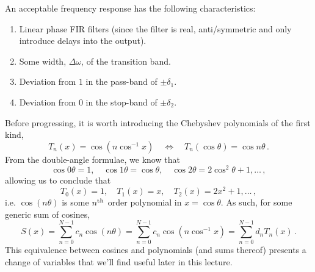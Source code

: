 %
An acceptable frequency response has the following characteristics:
%
\begin{enumerate}
\item Linear phase FIR filters (since the filter is real, anti/symmetric
  and only introduce delays into the output).
\item Some width, $\Delta\omega$, of the transition band.
\item Deviation from $1$ in the pass-band of $\pm\delta_1$.
\item Deviation from $0$ in the stop-band of $\pm\delta_2$.
\end{enumerate}

Before progressing, it is worth introducing the Chebyshev polynomials
of the first kind,
%
\begin{displaymath}
  T_n(x) = \cos\left(n\cos^{-1}x\right) \quad\Longleftrightarrow\quad
  T_n(\cos \theta) = \cos n\theta \,.
\end{displaymath}
%
From the double-angle formulae, we know that
%
\begin{displaymath}
  \cos 0\theta = 1, \quad \cos 1\theta = \cos\theta, \quad \cos 2\theta = 2\cos^2\theta + 1, \hdots \,,
\end{displaymath}
%
allowing us to conclude that
%
\begin{displaymath}
  T_0(x) = 1, \quad T_1(x) = x, \quad T_2(x) = 2x^2 + 1, \hdots \,,
\end{displaymath}
%
i.e. $\cos(n\theta)$ is some $n^\mathrm{th}\mkern1mu$ order polynomial in $x = \cos\theta$.
As such, for some generic sum of cosines,
%
\begin{displaymath}
  S(x) = \sum_{n=0}^{N-1} c_n\cos(n\theta)
  = \sum_{n=0}^{N-1}c_n\cos(n\cos^{-1}x)
  = \sum_{n=0}^{N-1} d_nT_n(x) \,.
\end{displaymath}
%
This equivalence between cosines and polynomials (and sums thereof) presents
a change of variables that we'll find useful later in this lecture.

